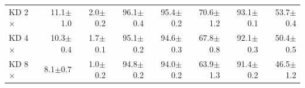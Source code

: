 \begin{tabular}{lrrrrrrr}
\midrule
KD 2$\times$ & 11.1{\scriptsize$\pm$1.0} & 2.0{\scriptsize$\pm$0.2} & 96.1{\scriptsize$\pm$0.4} & 95.4{\scriptsize$\pm$0.2} & 70.6{\scriptsize$\pm$1.2} & 93.1{\scriptsize$\pm$0.1} & 53.7{\scriptsize$\pm$0.4} \\
KD 4$\times$ & 10.3{\scriptsize$\pm$0.4} & 1.7{\scriptsize$\pm$0.1} & 95.1{\scriptsize$\pm$0.2} & 94.6{\scriptsize$\pm$0.3} & 67.8{\scriptsize$\pm$0.8} & 92.1{\scriptsize$\pm$0.3} & 50.4{\scriptsize$\pm$0.5} \\
KD 8$\times$ & 8.1{\scriptsize$\pm$0.7} & 1.0{\scriptsize$\pm$0.2} & 94.8{\scriptsize$\pm$0.2} & 94.0{\scriptsize$\pm$0.2} & 63.9{\scriptsize$\pm$1.3} & 91.4{\scriptsize$\pm$0.2} & 46.5{\scriptsize$\pm$1.2} \\
\bottomrule
\end{tabular}
